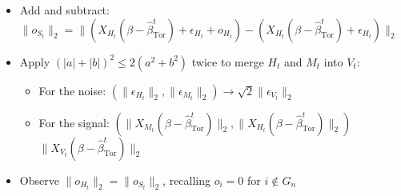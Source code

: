 \begin{frame}[shrink=10]
    \begin{itemize}
        \item Add and subtract: {\small
            \(\displaystyle
            \|o_{S_t}\|_2
            =
            \big\|
            (X_{H_t}(\beta-\hat{\beta}_{\text{Tor}}^t)+\epsilon_{H_t}+o_{H_t})
            -
            (X_{H_t}(\beta-\hat{\beta}_{\text{Tor}}^t)+\epsilon_{H_t})
            \big\|_2
            \)
            }
        \item Apply $(|a|+|b|)^2 \leq 2(a^2+b^2)$ twice to merge $H_t$ and $M_t$ into $V_t$:
        \begin{itemize}
            \item For the noise: {\small $(\|\epsilon_{H_t}\|_2, \|\epsilon_{M_t}\|_2) \to \sqrt{2}\|\epsilon_{V_t}\|_2$}
            \item For the signal: {\small $(\|X_{M_t} (\beta - \hat{\beta}_{\text{Tor}}^t)\|_2, \|X_{H_t} (\beta - \hat{\beta}_{\text{Tor}}^t)\|_2)$ \to {}$\|X_{V_t} (\beta - \hat{\beta}_{\text{Tor}}^t)\|_2$}
        \end{itemize}
        \item Observe $\|o_{H_t}\|_2=\|o_{S_t}\|_2$, recalling $o_i = 0$ for $i \notin G_n$
    \end{itemize}
\end{frame}

